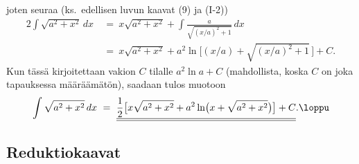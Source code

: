 joten seuraa (ks.\ edellisen luvun kaavat (9) ja (I-2))
\begin{align*}
2\int \sqrt{a^2+x^2}\,dx\ &=\ x\sqrt{a^2+x^2} + \int \frac{a}{\sqrt{(x/a)^2+1}}\,dx \\
                          &=\ x\sqrt{a^2+x^2} + a^2\ln\bigl[(x/a)+\sqrt{(x/a)^2+1}\,\bigr]+C.
\end{align*}
Kun tässä kirjoitettaan vakion $C$ tilalle $a^2\ln a+C$ (mahdollista, koska $C$ on joka 
tapauksessa määräämätön), saadaan tulos muotoon
\[
\int \sqrt{a^2+x^2}\,dx\ 
  =\ \underline{\underline{\frac{1}{2}\bigl[x\sqrt{a^2+x^2} 
                + a^2\ln\bigl(x + \sqrt{a^2+x^2}\bigr)\bigr]+C}}. \loppu
\]

\subsection*{Reduktiokaavat}

